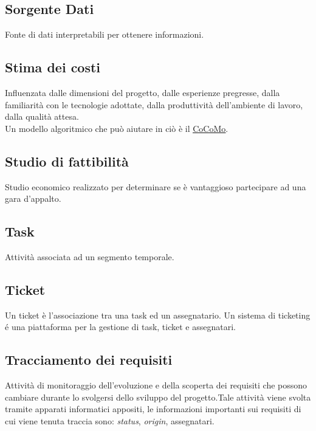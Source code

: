	\subsection{Sorgente Dati}
	\label{sec:sorgentedati}
	Fonte di dati interpretabili per ottenere informazioni.
	
	
	\subsection{Stima dei costi}
	\label{sec:stimacosti}
	Influenzata dalle dimensioni del progetto, dalle esperienze pregresse, dalla familiarità con le tecnologie adottate, dalla produttività dell'ambiente di lavoro, dalla qualità attesa. \\Un modello algoritmico che può aiutare in ciò è il \underline{\hyperref[sec:cocomo]{CoCoMo}}.

	
	\subsection{Studio di fattibilità}
	\label{sec:studiofattibilita}
	Studio economico realizzato per determinare se è vantaggioso partecipare ad una gara d'appalto.
	
	
	\newpage
	
	
	\subsection{Task}
	\label{sec:task}
	Attività associata ad un segmento temporale.
		

	\subsection{Ticket}
	\label{sec:telegram}
	Un ticket è l'associazione tra una task ed un assegnatario. Un sistema di ticketing é una piattaforma per la gestione di task, ticket e assegnatari. 


	\subsection{Tracciamento dei requisiti}
	\label{sec:tracciamentorequisiti}
	Attività di monitoraggio dell'evoluzione e della scoperta dei requisiti che possono cambiare durante lo svolgersi dello sviluppo del progetto.Tale attività viene svolta tramite apparati informatici appositi, le informazioni importanti sui requisiti di cui viene tenuta traccia sono: \emph{status}, \emph{origin}, assegnatari.


